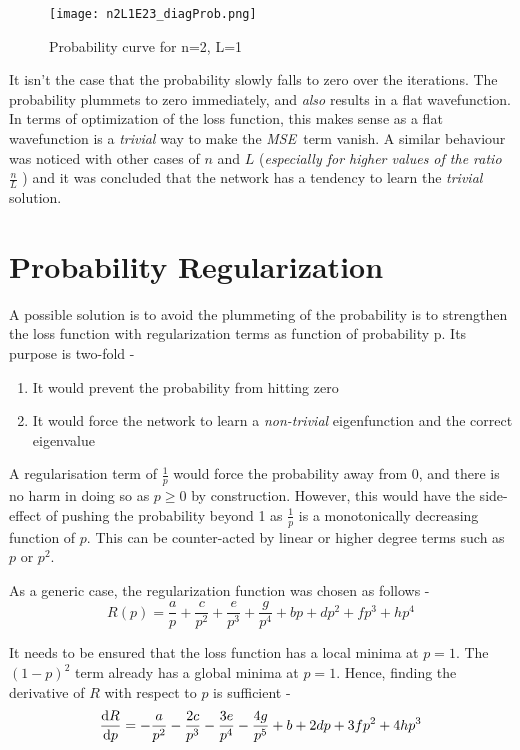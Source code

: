 \documentclass{article}
\newcommand{\MSE}{\textit{MSE}}
\newcommand{\nLratio}{$\displaystyle{\frac{n}{L}}$ }
\begin{document}
\begin{figure}[!htb]
    \centering
    \texttt{[image: n2L1E23\_diagProb.png]}
    \label{fig:n2L1_diagProb}
    \caption{Probability curve for n=2, L=1}
\end{figure}

\justify
It isn't the case that the probability slowly falls to zero over the iterations. The probability plummets to zero immediately, and \textit{also} results in a flat wavefunction. In terms of optimization of the loss function, this makes sense as a flat wavefunction is a \textit{trivial} way to make the \MSE \ term vanish. A similar behaviour was noticed with other cases of $n$ and $L$ (\textit{especially for higher values of the ratio \nLratio}) and it was concluded that the network has a tendency to learn the \textit{trivial} solution.


\section{Probability Regularization}

\justify
A possible solution is to avoid the plummeting of the probability is to strengthen the loss function with regularization terms as function of probability p. Its purpose is two-fold -
\begin{enumerate}
    \item It would prevent the probability from hitting zero
    \item It would force the network to learn a \textit{non-trivial} eigenfunction and the correct eigenvalue
\end{enumerate}

\justify
A regularisation term of $\displaystyle{\frac{1}{p}}$ would force the probability away from 0, and there is no harm in doing so as $p \geq 0$ by construction. However, this would have the side-effect of pushing the probability beyond 1 as $\displaystyle{\frac{1}{p}}$ is a monotonically decreasing function of $p$. This can be counter-acted by linear or higher degree terms such as $p$ or $p^2$. 

\justify
As a generic case, the regularization function was chosen as follows -
$$\displaystyle{
R(p) = \frac{a}{p} + \frac{c}{p^2} + \frac{e}{p^3} + \frac{g}{p^4} + bp + dp^2 + fp^3 + hp^4
}$$

\justify
It needs to be ensured that the loss function has a local minima at $p=1$. The $(1-p)^2$ term already has a global minima at $p=1$. Hence, finding the derivative of $R$ with respect to $p$ is sufficient -
$$\displaystyle{\dv{R}{p} = -\frac{a}{p^2} - \frac{2c}{p^3} - \frac{3e}{p^4} - \frac{4g}{p^5} + b + 2dp + 3fp^2 + 4hp^3}$$
\end{document}
